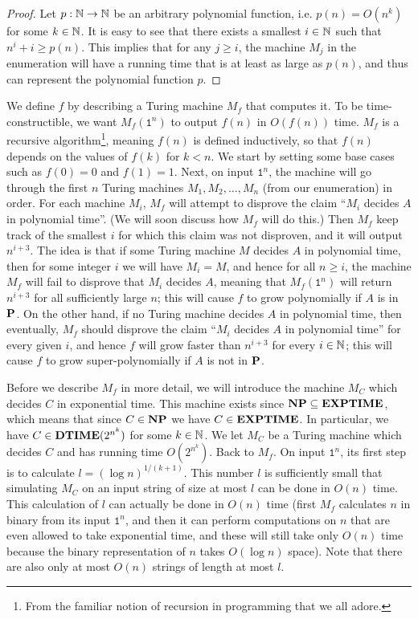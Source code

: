 \documentclass[11pt,twoside=off,numbers=noenddot]{scrbook}
\begin{document}
\begin{proof}
  Let $p : \mathbb N \to \mathbb N$ be an arbitrary polynomial function, i.e. $p(n) = O(n^k)$ for some $k \in \mathbb N$. It is easy to see that there exists a smallest $i \in \mathbb N$ such that $n^i + i \geq p(n)$. This implies that for any $j \geq i$, the machine $M_j$ in the enumeration will have a running time that is at least as large as $p(n)$, and thus can represent the polynomial function $p$.
\end{proof}

We define $f$ by describing a Turing machine $M_f$ that computes it. To be time-constructible, we want $M_f(\texttt{1}^n)$ to output $f(n)$ in $O(f(n))$ time. $M_f$ is a recursive algorithm\footnote{From the familiar notion of recursion in programming that we all adore.}, meaning $f(n)$ is defined inductively, so that $f(n)$ depends on the values of $f(k)$ for $k < n$. We start by setting some base cases such as $f(0) = 0$ and $f(1) = 1$. Next, on input $\texttt{1}^n$, the machine will go through the first $n$ Turing machines $M_1, M_2, \dots, M_n$ (from our enumeration) in order. For each machine $M_i$, $M_f$ will attempt to disprove the claim ``$M_i$ decides $A$ in polynomial time''. (We will soon discuss how $M_f$ will do this.) Then $M_f$ keep track of the smallest $i$ for which this claim was not disproven, and it will output $n^{i + 3}$. The idea is that if some Turing machine $M$ decides $A$ in polynomial time, then for some integer $i$ we will have $M_i = M$, and hence for all $n \geq i$, the machine $M_f$ will fail to disprove that $M_i$ decides $A$, meaning that $M_f(\texttt{1}^n)$ will return $n^{i + 3}$ for all sufficiently large $n$; this will cause $f$ to grow polynomially if $A$ is in $\textbf{P}$. On the other hand, if no Turing machine decides $A$ in polynomial time, then eventually, $M_f$ should disprove the claim ``$M_i$ decides $A$ in polynomial time'' for every given $i$, and hence $f$ will grow faster than $n^{i + 3}$ for every $i \in \mathbb N$; this will cause $f$ to grow super-polynomially if $A$ is not in $\textbf{P}$.

Before we describe $M_f$ in more detail, we will introduce the machine $M_C$ which decides $C$ in exponential time. This machine exists since $\textbf{NP} \subseteq \textbf{EXPTIME}$, which means that since $C \in \textbf{NP}$ we have $C \in \textbf{EXPTIME}$. In particular, we have $C \in \textbf{DTIME}(2^{n^k})$ for some $k \in \mathbb N$. We let $M_C$ be a Turing machine which decides $C$ and has running time $O(2^{n^k})$. Back to $M_f$. On input $\texttt{1}^n$, its first step is to calculate $l = (\log n)^{1 / (k + 1)}$. This number $l$ is sufficiently small that simulating $M_C$ on an input string of size at most $l$ can be done in $O(n)$ time. This calculation of $l$ can actually be done in $O(n)$ time (first $M_f$ calculates $n$ in binary from its input $\texttt{1}^n$, and then it can perform computations on $n$ that are even allowed to take exponential time, and these will still take only $O(n)$ time because the binary representation of $n$ takes $O(\log n)$ space). Note that there are also only at most $O(n)$ strings of length at most $l$.
\end{document}
